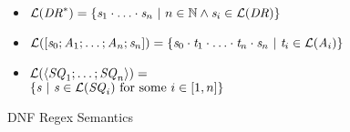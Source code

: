 \begin{figure}
\begin{itemize}
\item $\mathcal{L}(\mathit{DR}^*) =
\{\mathit{s}_1\cdot\ldots\cdot\mathit{s}_n ~|~ n\in\mathbb{N} \wedge \mathit{s}_i\in\mathcal{L}(\mathit{DR})\}$
\item $\mathcal{L}([\mathit{s}_0;\mathit{A}_1;\ldots;\mathit{A}_n;\mathit{s}_n])=
\{\mathit{s}_0\cdot\mathit{t}_1\cdot\ldots\cdot\mathit{t}_n\cdot\mathit{s}_n ~|~ \mathit{t}_i\in\mathcal{L}(\mathit{A}_i)\}$
\item $\mathcal{L}(\langle\mathit{SQ}_1;\ldots;\mathit{SQ}_n\rangle)=$\\
\hspace*{.5em}$\{\mathit{s} ~|~ \mathit{s} \in \mathcal{L}(\mathit{SQ}_i) \text{ for some $i\in[1,n]$}\}$
\end{itemize}
\caption{DNF Regex Semantics}
\label{fig:dnf-regex-semantics}
\end{figure}


